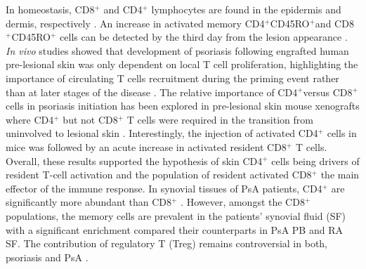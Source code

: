 In homeostasis, CD8$^+$ and CD4$^+$ lymphocytes are found in the epidermis and dermis, respectively \parencite{Clark2006}. An increase in activated memory CD4$^{+}$CD45RO$^{+}$and CD8$^{+}$CD45RO$^{+}$ cells can be detected by the third day from the lesion appearance \parencite{Clark2006,Perera2012}. \textit{In vivo} studies showed that development of psoriasis following engrafted human pre-lesional skin was only dependent on local T cell proliferation, highlighting the importance of circulating T cells recruitment during the priming event rather than at later stages of the disease \parencite{Wrone-Smith1996,Nickoloff1999,Perera2012}. The relative importance of CD4$^+$versus CD8$^+$ cells in psoriasis initiation has been explored in pre-lesional skin mouse xenografts where CD4$^+$ but not CD8$^+$ T cells were required in the transition from uninvolved to lesional skin \parencite{Nickoloff1999}. Interestingly, the injection of activated CD4$^+$ cells in mice was followed by an acute increase in activated resident CD8$^+$ T cells. Overall, these results supported the hypothesis of skin CD4$^+$ cells being drivers of resident T-cell activation and the population of resident activated CD8$^+$ the main effector of the immune response. In synovial tissues of PsA patients, CD4$^+$ are significantly more abundant than CD8$^+$ \parencite{Diani2015}. However, amongst the CD8$^+$ populations, the memory cells are prevalent in the patients’ synovial fluid (SF) with a significant enrichment compared their counterparts in PsA PB and RA SF\parencite{Costello1999}. The contribution of regulatory T (Treg) remains controversial in both, psoriasis and PsA \parencite{Perera2012}. 

